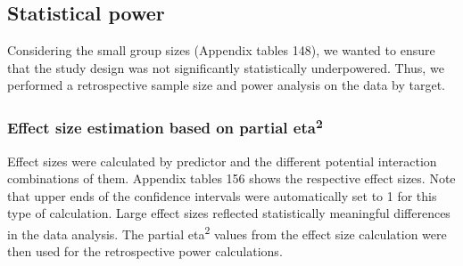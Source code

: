 \documentclass[
  12pt,
  letterpaper,
]{article}
\begin{document}
\subsection{Statistical power}\label{statistical-power-4}

Considering the small group sizes (Appendix tables 148), we wanted to ensure that the study design was not significantly statistically underpowered. Thus, we performed a retrospective sample size and power analysis on the data by target.

\subsubsection{\texorpdfstring{Effect size estimation based on partial eta\textsuperscript{2}}{Effect size estimation based on partial eta2}}\label{effect-size-estimation-based-on-partial-eta2-4}

Effect sizes were calculated by predictor and the different potential interaction combinations of them. Appendix tables 156 shows the respective effect sizes. Note that upper ends of the confidence intervals were automatically set to 1 for this type of calculation. Large effect sizes reflected statistically meaningful differences in the data analysis. The partial eta\textsuperscript{2} values from the effect size calculation were then used for the retrospective power calculations.
\end{document}

